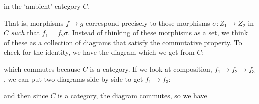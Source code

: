 \documentclass{report}
\begin{document}
\begin{examples}
\begin{example}[\label{exm:1.3.5}]
\begin{itemize}
                \begin{center}
                \end{center}
                in the `ambient' category $C$.
            \end{itemize}
            That is, morphisms $f \rightarrow g$ correspond precisely to those morphisms $\sigma : Z_{1} \rightarrow Z_{2}$ in $C$ \textit{such} that $f_{1} = f_{2}\sigma$. Instead of thinking of these morphisms as a set, we think of these as a collection of diagrams that satisfy the commutative property. To check for the identity, we have the diagram which we get from $C$:
            \begin{center}
            \end{center}
            which commutes because $C$ is a category. If we look at composition, $f_{1} \rightarrow f_{2} \rightarrow f_{3}$, we can put two diagrams side by side to get $f_{1} \rightarrow f_{3}$:
            \begin{center}
            \end{center}
            and then since $C$ is a category, the diagram commutes, so we have
            \begin{center}
\end{center}
\end{example}
\end{examples}
\end{document}
